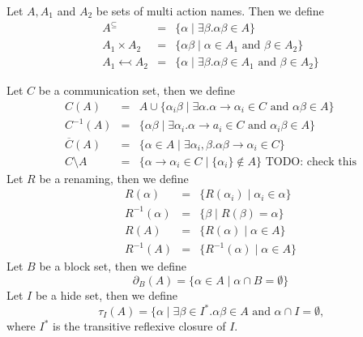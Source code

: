 \documentclass{article}
\begin{document}
Let $A,A_{1}$ and $A_{2}$ be sets of multi action names. Then we define%
\begin{eqnarray*}
A^{\subseteq } &=&\{\alpha \mid \exists \beta .\alpha \beta \in A\} \\
A_{1}\times A_{2} &=&\{\alpha \beta \mid \alpha \in A_{1}\text{ and }\beta
\in A_{2}\} \\
A_{1}\leftarrowtail A_{2} &=&\{\alpha \mid \exists \beta .\alpha \beta \in
A_{1}\text{ and }\beta \in A_{2}\}
\end{eqnarray*}

Let $C$ be a communication set, then we define%
\begin{eqnarray*}
C(A) &=&A\cup \{\alpha _{i}\beta \mid \exists \alpha .\alpha \rightarrow
\alpha _{i}\in C\text{ and }\alpha \beta \in A\} \\
C^{-1}(A) &=&\{\alpha \beta \mid \exists \alpha _{i}.\alpha \rightarrow
a_{i}\in C\text{ and }\alpha _{i}\beta \in A\} \\
\overline{C}(A) &=&\{\alpha \in A\mid \exists \alpha _{i},\beta .\alpha
\beta \rightarrow \alpha _{i}\in C\} \\
C\setminus A &=&\{\alpha \rightarrow \alpha _{i}\in C\mid \{\alpha
_{i}\}\notin A\}\text{ TODO: check this}
\end{eqnarray*}%
Let $R$ be a renaming, then we define%
\begin{eqnarray*}
R(\alpha ) &=&\{R(\alpha _{i})\mid \alpha _{i}\in \alpha \} \\
R^{-1}(\alpha ) &=&\{\beta \mid R(\beta )=\alpha \} \\
R(A) &=&\{R(\alpha )\mid \alpha \in A\} \\
R^{-1}(A) &=&\{R^{-1}(\alpha )\mid \alpha \in A\}
\end{eqnarray*}%
Let $B$ be a block set, then we define%
\[
\partial _{B}(A)=\{\alpha \in A\mid \alpha \cap B=\emptyset \} 
\]%
Let $I$ be a hide set, then we define%
\[
\tau _{I}(A)=\{\alpha \mid \exists \beta \in I^{\ast }.\alpha \beta \in A%
\text{ and }\alpha \cap I=\emptyset \text{,} 
\]%
where $I^{\ast }$ is the transitive reflexive closure of $I$.\newpage
\end{document}
